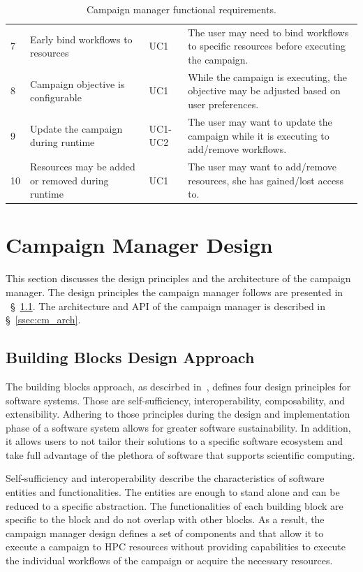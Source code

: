 \begin{table}[t]
\begin{tabular}{@{}p{1.5cm}|p{2.8cm}p{1.5cm}p{6cm}@{}}
         7 & 
         Early bind workflows to resources &
         UC1 &
         The user may need to bind workflows to specific resources before executing the campaign.\\
         8 & 
         Campaign objective is configurable & 
         UC1 & 
         While the campaign is executing, the objective may be adjusted based on user preferences.\\
         9 &
         Update the campaign during runtime &
         UC1-UC2 &
         The user may want to update the campaign while it is executing to add/remove workflows.\\
         10 &
         Resources may be added or removed during runtime & 
         UC1 & 
         The user may want to add/remove resources, she has gained/lost access to.\\
        \bottomrule
    \end{tabular}
    \caption{Campaign manager functional requirements.\label{tab:fun_reqs}}
\end{table}

\section{Campaign Manager Design}
This section discusses the design principles and the architecture of the campaign manager.
The design principles the campaign manager follows are presented in ~\S~\ref{ssec:building_blocks}.
The architecture and API of the campaign manager is described in \S~\ref{ssec:cm_arch}.
\subsection{Building Blocks Design Approach}
\label{ssec:building_blocks}
The building blocks approach, as descirbed in~\cite{turilli2019middleware}, defines four design principles for software systems.
Those are self-sufficiency, interoperability, composability, and extensibility.
Adhering to those principles during the design and implementation phase of a software system allows for greater software sustainability.
In addition, it allows users to not tailor their solutions to a specific software ecosystem and take full advantage of the plethora of software that supports scientific computing.

Self-sufficiency and interoperability describe the characteristics of software entities and functionalities.
The entities are enough to stand alone and can be reduced to a specific abstraction.
The functionalities of each building block are specific to the block and do not overlap with other blocks.
As a result, the campaign manager design defines a set of components and that allow it to execute a campaign to HPC resources without providing capabilities to execute the individual workflows of the campaign or acquire the necessary resources.

